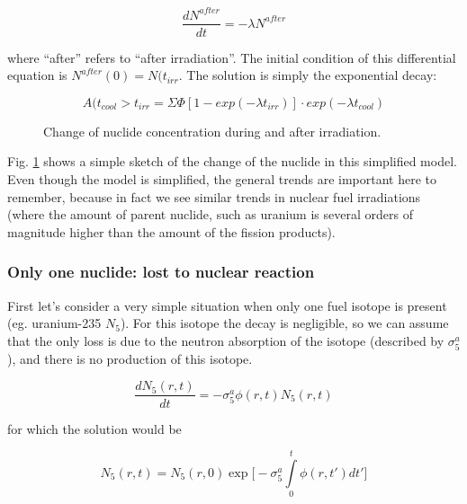 \begin{equation}
\frac{dN^{after}}{dt}=-\lambda N^{after}
\end{equation}

\noindent where ``after'' refers to ``after irradiation''. The initial condition of this differential equation is $N^{after}(0)=N(t_{irr}$. The solution is simply the exponential decay:

\begin{equation}
A(t_{cool}>t_{irr}=\Sigma\Phi[1-exp(-\lambda t_{irr})]\cdot exp(-\lambda t_{cool})
\end{equation}


\begin{figure}[ht!]
\protect {}\protect
\caption{\label{fig:irradiationconc} \footnotesize{Change of nuclide concentration during and after irradiation.}}
\end{figure}

Fig. \ref{fig:irradiationconc} shows a simple sketch of the change of the nuclide in this simplified model. Even though the model is simplified, the general trends are important here to remember, because in fact we see similar trends in nuclear fuel irradiations (where the amount of parent nuclide, such as uranium is several orders of magnitude higher than the amount of the fission products).

\subsubsection*{Only one nuclide: lost to nuclear reaction}

First let's consider a very simple situation when only one fuel isotope is present (eg. uranium-235 $N_5$). For this isotope the decay is negligible, so we can assume that the only loss is due to the neutron absorption of  the isotope (described by $\sigma_5^a$), and there is no production of this isotope.

\begin{equation}
\frac{dN_5(r,t)}{dt}=-\sigma_5^a\phi(r,t)N_5(r,t)
\end{equation}

for which the solution would be 

\begin{equation}
N_5(r,t)=N_5(r,0)\exp\Big[-\sigma_5^a\int\limits_0^t\phi(r,t')dt'\Big]
\end{equation}

